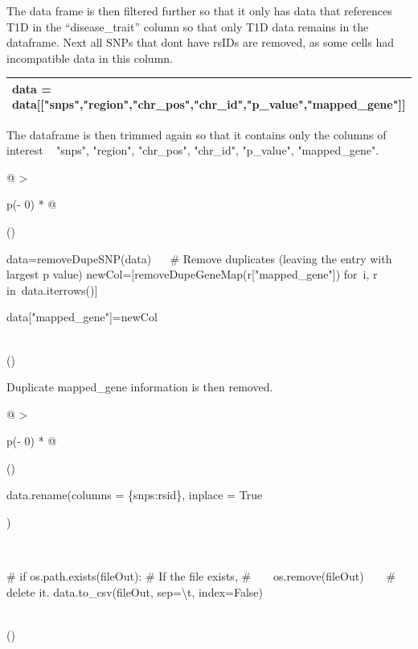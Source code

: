 \documentclass[12pt,a4paper]{article}
\begin{document}
{The data frame is then filtered further so that it only has data that
references T1D in the ``disease\_trait'' column so that only T1D data
remains in the dataframe. Next all SNPs that don\textquotesingle t have
rsIDs are removed, as some cells had incompatible data in this column.}

\protect\hypertarget{t.132f647eb56f42c8d7dbb1fffca78301f723bdb3}{}{}\protect\hypertarget{t.5}{}{}

\begin{longtable}[]{@{}l@{}}
\toprule()
\endhead
{data =
data{[}{[}}{"snps"}{,}{"region"}{,}{"chr\_pos"}{,}{"chr\_id"}{,}{"p\_value"}{,}{"mapped\_gene"}{{]}{]}} \\
\bottomrule()
\end{longtable}

{The da}{taframe is then trimmed again so that it contains only the
columns of interest ~ "snps", "region", "chr\_pos", "chr\_id",
"p\_value", "mapped\_gene". }

{}

\protect\hypertarget{t.8adbe8fae2f67de92759b4b70695249a62c02e6d}{}{}\protect\hypertarget{t.6}{}{}

\begin{longtable}[]{@{}
  >{\raggedright\arraybackslash}p{(\columnwidth - 0\tabcolsep) * }@{}}
\toprule()
\endhead
\begin{minipage}[t]{\linewidth}\raggedright
{data=removeDupeSNP(data) ~ ~}{\# Remove duplicates (leaving the entry
with largest p value)}{\hfill\break
newCol={[}removeDupeGeneMap(r{[}}{"mapped\_gene"}{{]}) }{for}{~i, r
}{in}{~data.iterrows(){]}}

{data{[}}{"mapped\_gene"}{{]}=newCol}\strut
\end{minipage} \\
\bottomrule()
\end{longtable}

{Duplicate mapped\_gene information is then removed.}

{}

\protect\hypertarget{t.efbc0c483d3f71e27abdb0a27605856edba6693c}{}{}\protect\hypertarget{t.7}{}{}

\begin{longtable}[]{@{}
  >{\raggedright\arraybackslash}p{(\columnwidth - 0\tabcolsep) * }@{}}
\toprule()
\endhead
\begin{minipage}[t]{\linewidth}\raggedright
{data.rename(columns =
\{}{\textquotesingle snps\textquotesingle{}}{:}{\textquotesingle rsid\textquotesingle{}}{\},
inplace = }{True}{)\\
\strut \\
}{\# if os.path.exists(fileOut): \# If the file exists,}{\hfill\break
}{\# ~ ~ os.remove(fileOut) ~ ~ \# delete it.}{\hfill\break
data.to\_csv(fileOut,
sep=}{\textquotesingle\textbackslash t\textquotesingle{}}{,
index=}{False}{)}\strut
\end{minipage} \\
\bottomrule()
\end{longtable}
\end{document}
